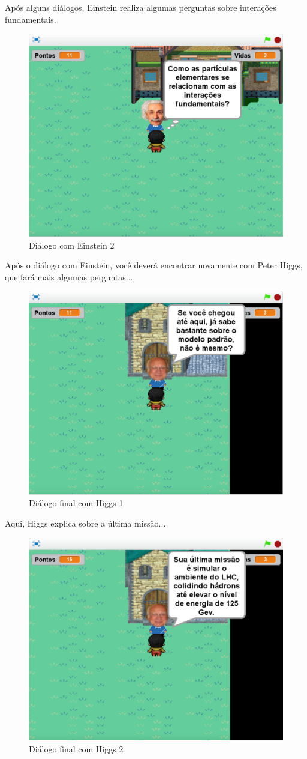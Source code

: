 \documentclass[12pt,fleqn]{book} %
\begin{document}
\newpage

Após alguns diálogos, Einstein realiza algumas perguntas sobre interações fundamentais.

\begin{figure}[h]
	\centering
	\includegraphics[width=0.65 \textwidth]{Produto/jogo_16}
	\caption{Diálogo com Einstein 2}
	\label{fig:app_a:jogo16}
\end{figure}


Após o diálogo com Einstein, você deverá encontrar novamente com Peter Higgs, que fará mais algumas perguntas...

\begin{figure}[h]
	\centering
	\includegraphics[width=0.65 \textwidth]{Produto/jogo_17}
	\caption{Diálogo final com Higgs 1}
	\label{fig:app_a:jogo17}
\end{figure}

\newpage

Aqui, Higgs explica sobre a última missão...

\begin{figure}[h]
	\centering
	\includegraphics[width=0.65 \textwidth]{Produto/jogo_18}
	\caption{Diálogo final com Higgs 2}
	\label{fig:app_a:jogo18}
\end{figure}
\end{document}
